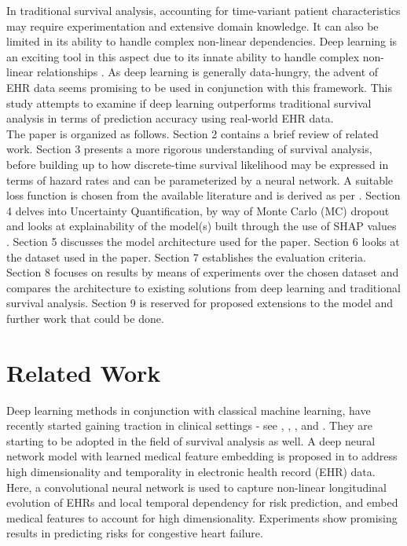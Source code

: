 \documentclass[%
 twocolumn,
 reprint,
 amsmath,amssymb,
 aps,nofootinbib
]{revtex4-2}
\begin{document}
In traditional survival analysis, accounting for time-variant patient characteristics may require experimentation and extensive domain knowledge. It can also be limited in its ability to handle complex non-linear dependencies. Deep learning is an exciting tool in this aspect due to its innate ability to handle complex non-linear relationships \cite{Cybenko_1992}. As deep learning is generally data-hungry, the advent of EHR data seems promising to be used in conjunction with this framework. This study attempts to examine if deep learning outperforms traditional survival analysis in terms of prediction accuracy using real-world EHR data.\\

The paper is organized as follows. Section 2 contains a brief review of related work. Section 3 presents a more rigorous understanding of survival analysis, before building up to how discrete-time survival likelihood may be expressed in terms of hazard rates \cite{Gensheimer_Narasimhan_2019} and can be parameterized by a neural network. A suitable loss function is chosen from the available literature and is derived as per \cite{kvamme_continuous_2019}. Section 4 delves into Uncertainty Quantification, by way of Monte Carlo (MC) dropout \cite{mcdropout} and looks at explainability of the model(s) built through the use of SHAP values \cite{shap}. Section 5 discusses the model architecture used for the paper. Section 6 looks at the dataset used in the paper. Section 7 establishes the evaluation criteria. Section 8 focuses on results by means of experiments over the chosen dataset and compares the architecture to existing solutions from deep learning and traditional survival analysis. Section 9 is reserved for proposed extensions to the model and further work that could be done.

\section{\label{rescon}Related Work}
Deep learning methods in conjunction with classical machine learning, have recently started gaining traction in clinical settings - see \cite{e2edlgjoreski}, \cite{nirschl2018deep}, \cite{10.1001/jamanetworkopen.2019.6972}, \cite{asolares2020} and \cite{lorenzoni_2019}. They are starting to be adopted in the field of survival analysis as well. A deep neural network model with learned medical feature embedding is proposed in \cite{che2017} to address high dimensionality and temporality in electronic health record (EHR) data. Here, a convolutional neural network is used to capture non-linear longitudinal evolution of EHRs and local temporal dependency for risk prediction, and embed medical features to account for high dimensionality. Experiments show promising results in predicting risks for congestive heart failure.\\
\end{document}
